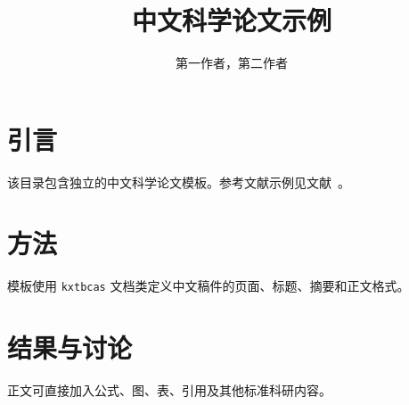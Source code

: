 \documentclass[review]{kxtbcas}
\title{中文科学论文示例}
\author{第一作者，第二作者}
\affiliation{研究机构，城市，国家}
\begin{document}
\maketitle

\section{引言}
该目录包含独立的中文科学论文模板。参考文献示例见文献~\cite{sample2026}。

\section{方法}
模板使用 \texttt{kxtbcas} 文档类定义中文稿件的页面、标题、摘要和正文格式。

\section{结果与讨论}
正文可直接加入公式、图、表、引用及其他标准科研内容。



\makeenglishsummary
\end{document}
